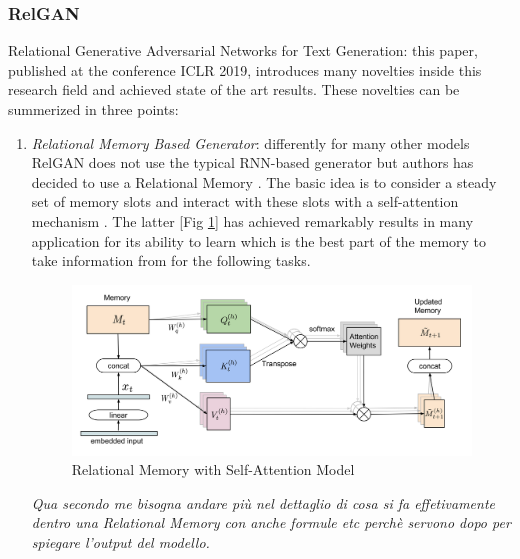 \subsubsection[RelGAN]{RelGAN \cite{RelGAN}}
\label{sect:RelGAN}
Relational Generative Adversarial Networks for Text Generation: this paper, published at the conference ICLR 2019, introduces many novelties inside this research field and achieved state of the art results. These novelties can be summerized in three points:
\begin{enumerate}
	\item \textit{Relational Memory Based Generator}: differently for many other models RelGAN does not use the typical RNN-based generator but authors has decided to use a Relational Memory \cite{Santoro}. The basic idea is to consider a steady set of memory slots and interact with these slots with a self-attention mechanism \cite{Vaswani}. The latter [Fig \ref{img:RelationalMemory}] has achieved remarkably results in many application for its ability to learn which is the best part of the memory to take information from for the following tasks.
	
	\begin{figure}[h!]
		\centering
		\includegraphics[width=0.8\linewidth]{Images/RelationalMemorySelfAttention.png}
		\caption{Relational Memory with Self-Attention Model}
		\label{img:RelationalMemory}
	\end{figure}
	
	\textit{Qua secondo me bisogna andare più nel dettaglio di cosa si fa effetivamente dentro una Relational Memory con anche formule etc perchè servono dopo per spiegare l'output del modello.}
	

\end{enumerate}
